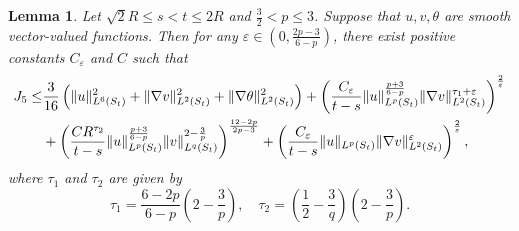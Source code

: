 \documentclass[11pt,reqno]{amsart}
\newtheorem{Lem}{Lemma}[section]
\numberwithin{Thm}{section}
\begin{document}
\begin{Lem}\label{Lem3.6}
Let $\sqrt{2}R\leq s<t\leq 2R$ and $\frac{3}{2}<p\leq3$. Suppose that $u,v,\theta$ are smooth vector-valued functions. Then for any $\varepsilon\in\left(0,\frac{2p-3}{6-p}\right)$, there exist positive constants $C_\varepsilon$  and $C$ such that
\begin{align}\label{ine3.23}
		J_5\leq&\frac{3}{16}\left(\|u\|_{L^6(S_t)}^2+\|\nabla v\|_{L^2(S_t)}^2+\|\nabla \theta\|_{L^2(S_t)}^2\right)+\left(\frac{C_\varepsilon}{t-s}\|u\|_{L^p(S_t)}^\frac{p+3}{6-p}\|\nabla v\|_{L^2(S_t)}^{\tau_1+\varepsilon}\right)^\frac{2}{\varepsilon}\notag\\
		&+\left(\frac{C R^{\tau_2}}{t-s}\|u\|_{L^p(S_t)}^\frac{p+3}{6-p}\|v\|_{L^q(S_t)}^{2-\frac{3}{p}}\right)^\frac{12-2p}{2p-3}+\left(\frac{C_\varepsilon}{t-s}\| u\|_{L^p(S_t)}\| \nabla v\|_{L^2(S_t)}^{\varepsilon}\right)^\frac{2}{\varepsilon},
\end{align}
where $\tau_1$ and $\tau_2$ are given by
$$\tau_1=\frac{6-2p}{6-p}\left(2-\frac{3}{p}\right),\quad \tau_2=\left(\frac{1}{2}-\frac{3}{q}\right)\left(2-\frac{3}{p}\right).$$
\end{Lem}
\end{document}
